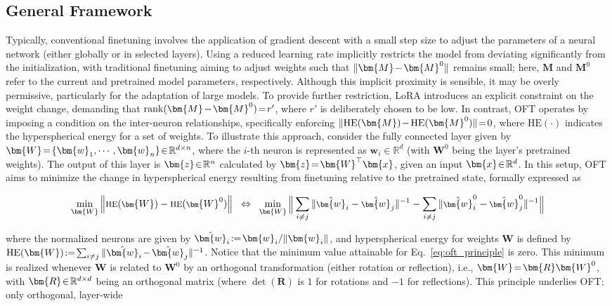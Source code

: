 \subsection{General Framework}

Typically, conventional finetuning involves the application of gradient descent with a small step size to adjust the parameters of a neural network (either globally or in selected layers). Using a reduced learning rate implicitly restricts the model from deviating significantly from the initialization, with traditional finetuning aiming to adjust weights such that $\thickmuskip=2mu \medmuskip=2mu \| \bm{M} - \bm{M}^0\|$ remains small; here, $\bm{M}$ and $\bm{M}^0$ refer to the current and pretrained model parameters, respectively. Although this implicit proximity is sensible, it may be overly permissive, particularly for the adaptation of large models. To provide further restriction, LoRA introduces an explicit constraint on the weight change, demanding that $\thickmuskip=2mu \medmuskip=2mu \text{rank}(\bm{M} - \bm{M}^0)=r'$, where $r'$ is deliberately chosen to be low. In contrast, OFT operates by imposing a condition on the inter-neuron relationships, specifically enforcing $\thickmuskip=2mu \medmuskip=2mu \| \text{HE}(\bm{M})-\text{HE}(\bm{M}^0) \|=0$, where $\text{HE}(\cdot)$ indicates the hyperspherical energy for a set of weights. To illustrate this approach, consider the fully connected layer given by $\thickmuskip=2mu \medmuskip=2mu \bm{W}=\{\bm{w}_1,\cdots,\bm{w}_n\}\in\mathbb{R}^{d\times n}$, where the $i$-th neuron is represented as $\bm{w}_i\in\mathbb{R}^{d}$ (with $\bm{W}^0$ being the layer’s pretrained weights). The output of this layer is $\thickmuskip=2mu \medmuskip=2mu \bm{z}\in\mathbb{R}^n$ calculated by $\thickmuskip=2mu \medmuskip=2mu \bm{z}=\bm{W}^\top\bm{x}$, given an input $\thickmuskip=2mu \medmuskip=2mu \bm{x}\in\mathbb{R}^d$. In this setup, OFT aims to minimize the change in hyperspherical energy resulting from finetuning relative to the pretrained state, formally expressed as

\begin{equation}\label{eq:oft_principle}
\footnotesize
\min_{\bm{W}} \left\| \text{HE}(\bm{W})-\text{HE}(\bm{W}^0)\right\|~~\Leftrightarrow~~\min_{\bm{W}} \bigg{\|} \sum_{i\neq j} \|\hat{\bm{w}}_i-\hat{\bm{w}}_j\|^{-1}-\sum_{i\neq j} \|\hat{\bm{w}}^0_i-\hat{\bm{w}}^0_j\|^{-1}\bigg{\|}
\end{equation}

where the normalized neurons are given by $\thickmuskip=2mu \medmuskip=2mu \hat{\bm{w}}_i:=\bm{w}_i/\|\bm{w}_i\|$, and hyperspherical energy for weights $\bm{W}$ is defined by $\thickmuskip=2mu \medmuskip=2mu \text{HE}(\bm{W}):= \sum_{i\neq j} \|\hat{\bm{w}}_i-\hat{\bm{w}}_j\|^{-1}$. Notice that the minimum value attainable for Eq.~\eqref{eq:oft_principle} is zero. This minimum is realized whenever $\bm{W}$ is related to $\bm{W}^0$ by an orthogonal transformation (either rotation or reflection), i.e., $\thickmuskip=2mu \medmuskip=2mu \bm{W}=\bm{R}\bm{W}^0$, with $\thickmuskip=2mu \medmuskip=2mu \bm{R}\in\mathbb{R}^{d\times d}$ being an orthogonal matrix (where $\det(\bm{R})$ is $1$ for rotations and $-1$ for reflections). This principle underlies OFT: only orthogonal, layer-wide

